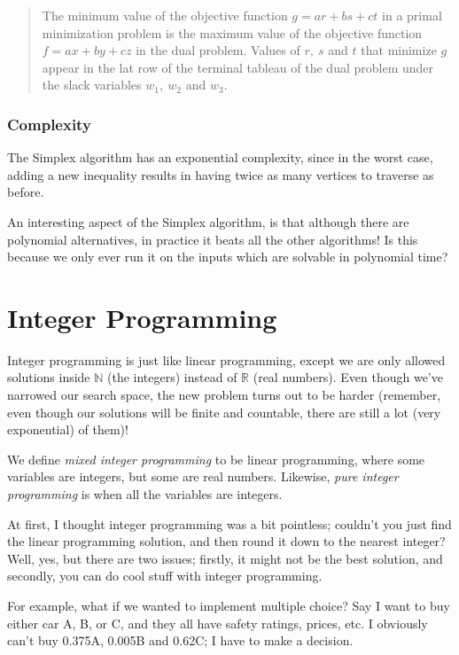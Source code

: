 \begin{quote}
  The minimum value of the objective function $g = ar + bs + ct$ in a primal
  minimization problem is the maximum value of the objective function $f = ax +
  by + cz$ in the dual problem. Values of $r,~s$ and $t$ that minimize $g$
  appear in the lat row of the terminal tableau of the dual problem under the
  slack variables $w_1,~w_2$ and $w_3$.
\end{quote}

\subsubsection{Complexity}

The Simplex algorithm has an exponential complexity, since in the worst case,
adding a new inequality results in having twice as many vertices to traverse as
before.

An interesting aspect of the Simplex algorithm, is that although there are
polynomial alternatives, in practice it beats all the other algorithms! Is this
because we only ever run it on the inputs which are solvable in polynomial time?

\section{Integer Programming}

Integer programming is just like linear programming, except we are only allowed
solutions inside $\mathbb{N}$ (the integers) instead of $\mathbb{R}$ (real
numbers). Even though we've narrowed our search space, the new problem turns out
to be harder (remember, even though our solutions will be finite and countable,
there are still a lot (very exponential) of them)!

We define \textit{mixed integer programming} to be linear programming, where
some variables are integers, but some are real numbers. Likewise, \textit{pure
integer programming} is when all the variables are integers.

At first, I thought integer programming was a bit pointless; couldn't you just
find the linear programming solution, and then round it down to the nearest
integer? Well, yes, but there are two issues; firstly, it might not be the best
solution, and secondly, you can do cool stuff with integer programming.

For example, what if we wanted to implement multiple choice? Say I want to buy
either car A, B, or C, and they all have safety ratings, prices, etc. I
obviously can't buy 0.375A, 0.005B and 0.62C; I have to make a decision.

